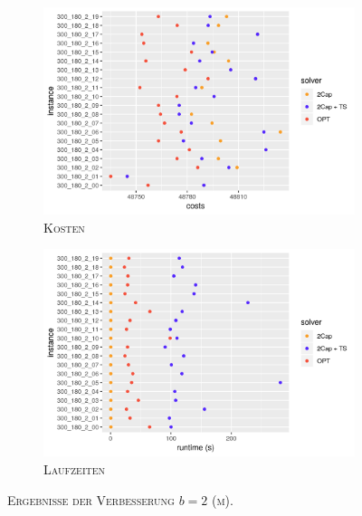 \begin{figure}[H]
\centering
\begin{subfigure}[b]{0.49\textwidth}
\includegraphics[width=\textwidth]{img/imp_b=2_m_costs.png}
\caption{\textsc{Kosten}}
\label{fig:imp_b=2_m_costs}
\end{subfigure}
\hfill
\begin{subfigure}[b]{0.49\textwidth}
\includegraphics[width=\textwidth]{img/imp_b=2_m_runtimes.png}
\caption{\textsc{Laufzeiten}}
\label{fig:imp_b=2_m_runtimes}
\end{subfigure}
\caption{\textsc{Ergebnisse der Verbesserung $b = 2$ (m)}.}
\label{fig:imp_res_b=2_m}
\end{figure}

